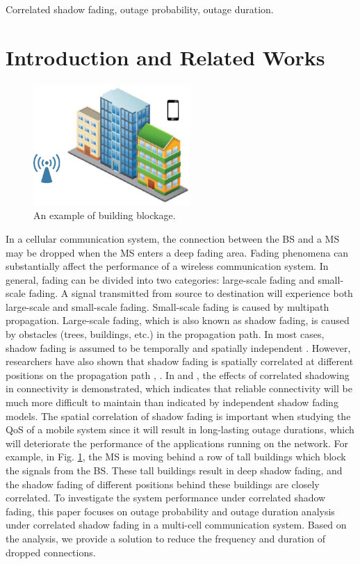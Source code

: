 \documentclass[journal,10pt]{IEEEtran}
\begin{document}
\begin{IEEEkeywords}
Correlated shadow fading, outage probability, outage duration.
\end{IEEEkeywords}

\section{Introduction and Related Works}
\begin{figure}
\centering
\includegraphics[width=6cm]{building.eps}
\caption{An example of building blockage.}
\label{building}
\end{figure}
\par In a cellular communication system, the connection between the BS and a MS may be dropped when the MS enters a deep fading area. Fading phenomena can substantially affect the performance of a wireless communication system. In general, fading can be divided into two categories: large-scale fading and small-scale fading. A signal transmitted from source to destination will experience both large-scale and small-scale fading. Small-scale fading is caused by multipath propagation. Large-scale fading, which is also known as shadow fading, is caused by obstacles (trees, buildings, etc.) in the propagation path. In most cases, shadow fading is assumed to be temporally and spatially independent \cite{rappaport1996wireless}.  However, researchers have also shown that shadow fading is spatially correlated at different positions on the propagation path \cite{gudmundson1991correlation}, \cite{zhang2008novel}. In \cite{fabbri2009impact} and \cite{patwari2008effects}, the effects of correlated shadowing in connectivity is demonstrated, which indicates that reliable connectivity will be much more difficult to maintain than indicated by independent shadow fading models. The spatial correlation of shadow fading is important when studying the QoS of a mobile system since it will result in long-lasting outage durations, which will deteriorate the performance of the applications running on the network. For example, in Fig. \ref{building}, the MS is moving behind a row of tall buildings which block the signals from the BS. These tall buildings result in deep shadow fading, and the shadow fading of different positions behind these buildings are closely correlated. To investigate the system performance under correlated shadow fading, this paper focuses on outage probability and outage duration analysis under correlated shadow fading in a multi-cell communication system. Based on the analysis, we provide a solution to reduce the frequency and duration of dropped connections.
\end{document}
